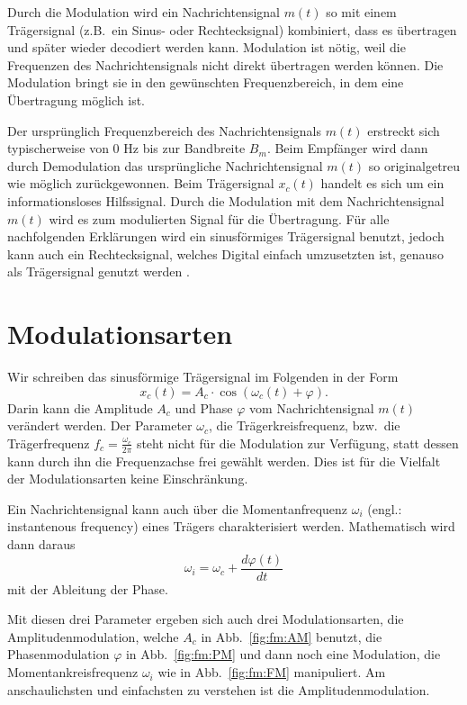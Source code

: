 %
%
%

Durch die Modulation wird ein Nachrichtensignal \(m(t)\) so mit einem
Trägersignal (z.B.~ein Sinus- oder Rechtecksignal) kombiniert,
dass es übertragen und später wieder decodiert werden kann.
Modulation ist nötig, weil die Frequenzen des Nachrichtensignals
nicht direkt übertragen werden können.
Die Modulation bringt sie in den gewünschten Frequenzbereich, in dem
eine Übertragung möglich ist.

Der ursprünglich Frequenzbereich des Nachrichtensignals \(m(t)\)
erstreckt sich typischerweise von 0 Hz bis zur Bandbreite \(B_m\).
Beim Empfänger wird dann durch Demodulation das ursprüngliche
Nachrichtensignal \(m(t)\) so originalgetreu wie möglich zurückgewonnen.
Beim Trägersignal \(x_c(t)\) handelt es sich um ein informationsloses
Hilfssignal.
Durch die Modulation mit dem Nachrichtensignal \(m(t)\) wird es zum
modulierten Signal für die Übertragung.
Für alle nachfolgenden Erklärungen wird ein sinusförmiges Trägersignal
benutzt, jedoch kann auch ein Rechtecksignal, welches Digital einfach
umzusetzten ist, genauso als Trägersignal genutzt werden \cite{fm:NAT}.

%
%
\section{Modulationsarten
\label{fm:section:modulation}}
Wir schreiben
das sinusförmige Trägersignal im Folgenden in der Form
\[
x_c(t) = A_c \cdot \cos(\omega_c(t)+\varphi).
\]
Darin kann die Amplitude \(A_c\) und Phase \(\varphi\) vom
Nachrichtensignal \(m(t)\) verändert werden.
Der Parameter \(\omega_c\), die Trägerkreisfrequenz, bzw.~die
Trägerfrequenz \(f_c = \frac{\omega_c}{2\pi}\)
steht nicht für die Modulation zur Verfügung, statt dessen kann durch
ihn die Frequenzachse frei gewählt werden.
Dies ist für die Vielfalt der Modulationsarten keine Einschränkung.

Ein Nachrichtensignal kann auch über die Momentanfrequenz
\(\omega_i\)
(engl.: instantenous frequency)
eines Trägers charakterisiert werden.
Mathematisch wird dann daraus
\[
    \omega_i = \omega_c + \frac{d \varphi(t)}{dt}
\]
mit der Ableitung der Phase\cite{fm:NAT}.

Mit diesen drei Parameter ergeben sich auch drei Modulationsarten,
die Amplitudenmodulation, welche \(A_c\) in Abb.~\ref{fig:fm:AM} benutzt, 
die Phasenmodulation \(\varphi\) in Abb.~\ref{fig:fm:PM} und dann noch
eine Modulation, die Momentankreisfrequenz \(\omega_i\) wie in
Abb.~\ref{fig:fm:FM} manipuliert.
Am anschaulichsten und einfachsten zu verstehen ist die
Amplitudenmodulation.

